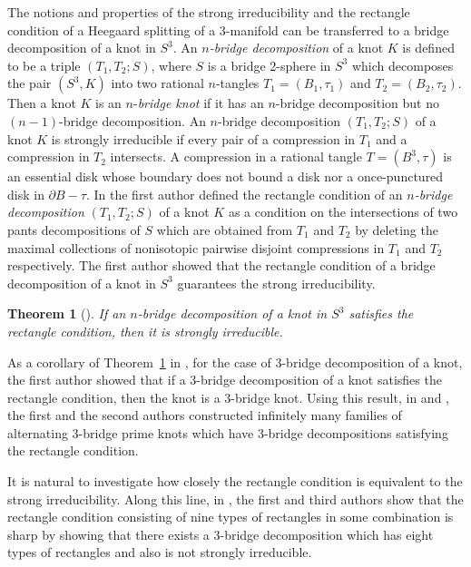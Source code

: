 \documentclass[12pt]{amsart}
\newtheorem{Thm}[theorem]{Theorem}
\begin{document}
The notions and properties of the strong irreducibility and the rectangle condition of a Heegaard splitting of a 3-manifold can be transferred to a bridge decomposition of a knot in $S^3$.
An $n$\textit{-bridge decomposition} of a knot $K$ is defined to be a triple $(T_1, T_2;S)$, where $S$ is a bridge 2-sphere in $S^3$ which decomposes the pair $(S^3, K)$ into two rational $n$-tangles $T_1=(B_1, \tau_1)$ and $T_2=(B_2, \tau_2)$. Then a knot $K$ is an $n$-\textit{bridge knot} if it has an $n$-bridge decomposition but no $(n-1)$-bridge decomposition.
An $n$-bridge decomposition $(T_1, T_2;S)$ of a knot $K$ is strongly irreducible if every pair of a compression in $T_1$ and a compression in $T_2$ intersects.
A compression in a rational tangle $T=(B^3, \tau)$ is an essential disk whose boundary does not bound a disk nor a once-punctured disk in $\partial B-\tau$.
In \cite{K20} the first author defined the rectangle condition of an $n$\textit{-bridge decomposition} $(T_1, T_2;S)$ of a knot $K$ as
a condition on the intersections of two pants decompositions of $S$ which are obtained from $T_1$ and $T_2$ by deleting the maximal collections of
nonisotopic pairwise disjoint compressions in $T_1$ and $T_2$ respectively.
The first author \cite{K20} showed that the rectangle condition of a bridge decomposition of a knot in $S^3$ guarantees the strong irreducibility.

\begin{Thm}[\cite{K20}]\label{Kwon2}
If an $n$-bridge decomposition of a knot in $S^3$ satisfies the rectangle condition, then it is strongly irreducible.
\end{Thm}

As a corollary of Theorem~\ref{Kwon2} in \cite{K20}, for the case of 3-bridge decomposition of a knot, the first author showed that
if a $3$-bridge decomposition of a knot satisfies the rectangle condition, then the knot is a 3-bridge knot.
Using this result, in \cite{KK21} and \cite{KK23}, the first and the second authors constructed infinitely many families of alternating 3-bridge prime knots which have 3-bridge decompositions satisfying the rectangle condition.

It is natural to investigate how closely the rectangle condition is equivalent to the strong irreducibility.
Along this line, in \cite{KL20}, the first and third authors show that the rectangle condition consisting of nine types of rectangles in some combination is sharp by showing that there exists a 3-bridge decomposition which has eight types of rectangles and also is not strongly irreducible.
\end{document}
